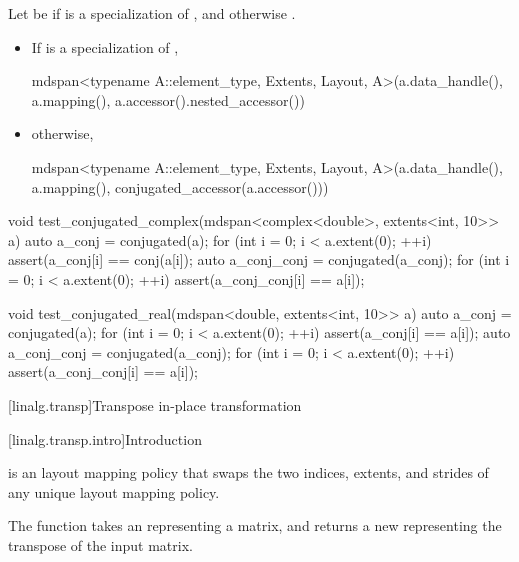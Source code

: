 \begin{itemdescr}
\pnum
Let  be
if  is a specialization of , and
otherwise .

\pnum
\returns
\begin{itemize}
\item
If  is a specialization of ,
\begin{codeblock}
mdspan<typename A::element_type, Extents, Layout, A>(a.data_handle(), a.mapping(),
                                                     a.accessor().nested_accessor())
\end{codeblock}
\item
otherwise,
\begin{codeblock}
mdspan<typename A::element_type, Extents, Layout, A>(a.data_handle(), a.mapping(),
                                                     conjugated_accessor(a.accessor()))
\end{codeblock}
\end{itemize}
\end{itemdescr}

\pnum
\begin{example}
\begin{codeblock}
void test_conjugated_complex(mdspan<complex<double>, extents<int, 10>> a) {
  auto a_conj = conjugated(a);
  for (int i = 0; i < a.extent(0); ++i) {
    assert(a_conj[i] == conj(a[i]);
  }
  auto a_conj_conj = conjugated(a_conj);
  for (int i = 0; i < a.extent(0); ++i) {
    assert(a_conj_conj[i] == a[i]);
  }
}

void test_conjugated_real(mdspan<double, extents<int, 10>> a) {
  auto a_conj = conjugated(a);
  for (int i = 0; i < a.extent(0); ++i) {
    assert(a_conj[i] == a[i]);
  }
  auto a_conj_conj = conjugated(a_conj);
  for (int i = 0; i < a.extent(0); ++i) {
    assert(a_conj_conj[i] == a[i]);
  }
}
\end{codeblock}
\end{example}

[linalg.transp]{Transpose in-place transformation}

[linalg.transp.intro]{Introduction}

\pnum
{} is an  layout mapping policy
that swaps the two indices, extents, and strides
of any unique  layout mapping policy.

\pnum
The  function takes an 
representing a matrix, and returns a new 
representing the transpose of the input matrix.

